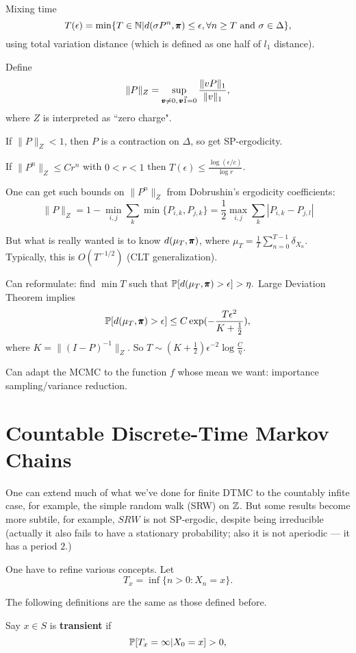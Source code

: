 Mixing time 
$$
T(\epsilon) = \min \{T \in \mathbb{N} | d(\sigma P^n, \pmb{\pi}) \le \epsilon, \forall n \ge T \text{ and } \sigma \in \Delta\},$$
using total variation distance (which is defined as one half of $l_1$ distance).

Define $$
\|P\|_Z = \sup_{\pmb{v} \neq 0,\, \pmb{v} \vec{1} = 0} \frac{\| v P\|_1}{\|v\|_1},
$$
where $Z$ is interpreted as ``zero charge".

If $\|P\|_Z < 1$, then $P$ is a contraction on $\Delta$, so get SP-ergodicity.

If $\| P^n \|_Z \le C r^n$ with $0 < r < 1$ then $T(\epsilon) \le \frac{\log (\epsilon/c)}{\log r}$.

One can get such bounds on $\|P^n\|_Z$ from Dobrushin's ergodicity coefficients:
$$
\|P\|_Z = 1 - \min_{i,j}\sum_{k} \min\{P_{i,k}, P_{j,k}\} =  \frac{1}{2} \max_{i,j} \sum_{k} |P_{i,k} - P_{j,l}|
$$

But what is really wanted is to know $d(\mu_T, \pmb{\pi})$, where $\mu_T = \frac{1}{T} \sum_{n=0}^{T-1} \delta_{X_n}$. Typically, this is $O (T^{-1/2})$ (CLT generalization).

Can reformulate: find $\min T$ such that $\mathbb{P} [d( \mu_T, \pmb{\pi}) > \epsilon] > \eta.$ Large Deviation Theorem implies 
$$\mathbb{P} [d( \mu_T, \pmb{\pi}) > \epsilon]  \le C \exp (- \frac{T\epsilon^2}{K + \frac{1}{2}}),$$ 
where $K = \|(I - P)^{-1}\|_Z$. So $T \sim (K+ \frac{1}{2})\epsilon^{-2} \log \frac{C}{\eta}$.

Can adapt the MCMC to the function $f$ whose mean we want: importance sampling/variance reduction.

\section{Countable Discrete-Time Markov Chains}

One can extend much of what we've done for finite DTMC to the countably infite case, for example, the simple random walk  (SRW) on $\mathbb{Z}$. But some results become more subtile, for example, $SRW$ is not SP-ergodic, despite being irreducible (actually it also fails to have a stationary probability; also it is not aperiodic --- it has a period $2$.)

One have to refine various concepts. Let
$$
T_x = \inf \{n > 0: X_n = x\}.
$$

The following definitions are the same as those defined before.
\begin{definition}[Transience]
    Say $x \in S$ is \textbf{transient} if 
$$
\mathbb{P} [T_x = \infty | X_0 = x] > 0,
$$
\end{definition}

